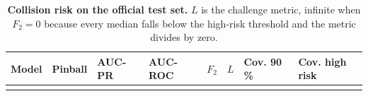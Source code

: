 \documentclass[3p,times,twocolumn]{elsarticle}
\begin{document}
\begin{table}[t]
\centering
\footnotesize
\caption{\textbf{Collision risk on the official test set.} \(L\) is the
challenge metric, infinite when \(F_2 = 0\) because every median falls
below the high-risk threshold and the metric divides by
zero.}\label{tbl:cac}
\begin{tabular}{@{}
>{\raggedright\arraybackslash}p{}
  >{\raggedleft\arraybackslash}p{}
  >{\raggedleft\arraybackslash}p{}
  >{\raggedleft\arraybackslash}p{}
  >{\raggedleft\arraybackslash}p{}
  >{\raggedleft\arraybackslash}p{}
  >{\raggedleft\arraybackslash}p{}
  >{\raggedleft\arraybackslash}p{}@{}}
\toprule\noalign{}
\begin{minipage}[b]{\linewidth}\raggedright
Model
\end{minipage} & \begin{minipage}[b]{\linewidth}\raggedleft
Pinball
\end{minipage} & \begin{minipage}[b]{\linewidth}\raggedleft
AUC-PR
\end{minipage} & \begin{minipage}[b]{\linewidth}\raggedleft
AUC-ROC
\end{minipage} & \begin{minipage}[b]{\linewidth}\raggedleft
\(F_2\)
\end{minipage} & \begin{minipage}[b]{\linewidth}\raggedleft
\(L\)
\end{minipage} & \begin{minipage}[b]{\linewidth}\raggedleft
Cov. 90 \%
\end{minipage} & \begin{minipage}[b]{\linewidth}\raggedleft
Cov. high risk
\end{minipage} \\
\midrule\noalign{}

\bottomrule\noalign{}


\end{tabular}
\end{table}
\end{document}
